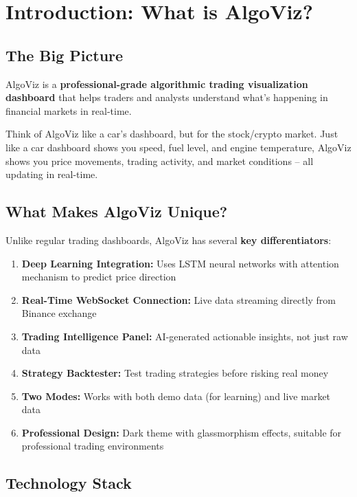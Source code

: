 \documentclass[12pt,a4paper]{article}
\begin{document}
\section{Introduction: What is AlgoViz?}

\subsection{The Big Picture}
AlgoViz is a \textbf{professional-grade algorithmic trading visualization dashboard} that helps traders and analysts understand what's happening in financial markets in real-time. 

\begin{tipbox}
Think of AlgoViz like a car's dashboard, but for the stock/crypto market. Just like a car dashboard shows you speed, fuel level, and engine temperature, AlgoViz shows you price movements, trading activity, and market conditions -- all updating in real-time.
\end{tipbox}

\subsection{What Makes AlgoViz Unique?}

Unlike regular trading dashboards, AlgoViz has several \textbf{key differentiators}:

\begin{enumerate}[label=\arabic*.]
    \item \textbf{Deep Learning Integration:} Uses LSTM neural networks with attention mechanism to predict price direction
    \item \textbf{Real-Time WebSocket Connection:} Live data streaming directly from Binance exchange
    \item \textbf{Trading Intelligence Panel:} AI-generated actionable insights, not just raw data
    \item \textbf{Strategy Backtester:} Test trading strategies before risking real money
    \item \textbf{Two Modes:} Works with both demo data (for learning) and live market data
    \item \textbf{Professional Design:} Dark theme with glassmorphism effects, suitable for professional trading environments
\end{enumerate}

\subsection{Technology Stack}
\end{document}
